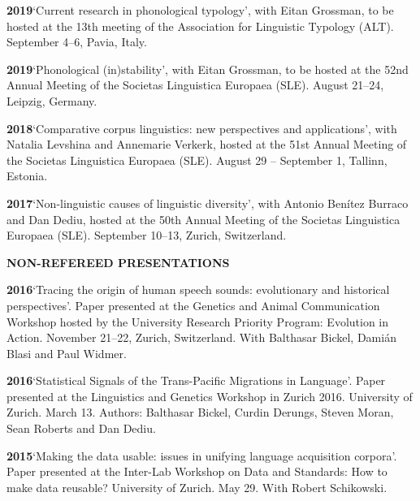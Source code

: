 \documentclass[11pt]{article}
\newcommand{\hangpara}{
 \setlength{\parindent}{0in} %
 \hangindent=0.42in %
}
\begin{document}
\hangpara
\vskip 6pt
{\bf 2019}\hspace{1ex}`Current research in phonological typology', with Eitan Grossman, to be hosted at the 13th meeting of the Association for Linguistic Typology (ALT). September 4--6, Pavia, Italy.

\hangpara
\vskip 6pt
{\bf 2019}\hspace{1ex}`Phonological (in)stability', with Eitan Grossman, to be hosted at the 52nd Annual Meeting of the Societas Linguistica Europaea (SLE). August 21--24, Leipzig, Germany.

\hangpara
\vskip 6pt
{\bf 2018}\hspace{1ex}`Comparative corpus linguistics: new perspectives and applications', with Natalia Levshina and Annemarie Verkerk, hosted at the 51st Annual Meeting of the Societas Linguistica Europaea (SLE). August 29 -- September 1, Tallinn, Estonia.

\hangpara
\vskip 6pt
{\bf 2017}\hspace{1ex}`Non-linguistic causes of linguistic diversity', with Antonio Benítez Burraco and Dan Dediu, hosted at the 50th Annual Meeting of the Societas Linguistica Europaea (SLE). September 10--13, Zurich, Switzerland.


\vskip 20pt
\begin{flushleft}
{\bf NON-REFEREED PRESENTATIONS}
\end{flushleft}

\hangpara
{\bf 2016}\hspace{1ex}`Tracing the origin of human speech sounds: evolutionary and historical perspectives'. Paper presented at the Genetics and Animal Communication Workshop hosted by the University Research Priority Program: Evolution in Action. November 21--22, Zurich, Switzerland. With Balthasar Bickel, Dami{\'a}n Blasi and Paul Widmer.

\hangpara
\vskip 6pt
{\bf 2016}\hspace{1ex}`Statistical Signals of the Trans-Pacific Migrations in Language'. Paper presented at the Linguistics and Genetics Workshop in Zurich 2016. University of Zurich. March 13. Authors: Balthasar Bickel, Curdin Derungs, Steven Moran, Sean Roberts and Dan Dediu.

\hangpara
\vskip 6pt
{\bf 2015}\hspace{1ex}`Making the data usable: issues in unifying language acquisition corpora'. Paper presented at the Inter-Lab Workshop on Data and Standards: How to make data reusable? University of Zurich. May 29. With Robert Schikowski.
\end{document}
